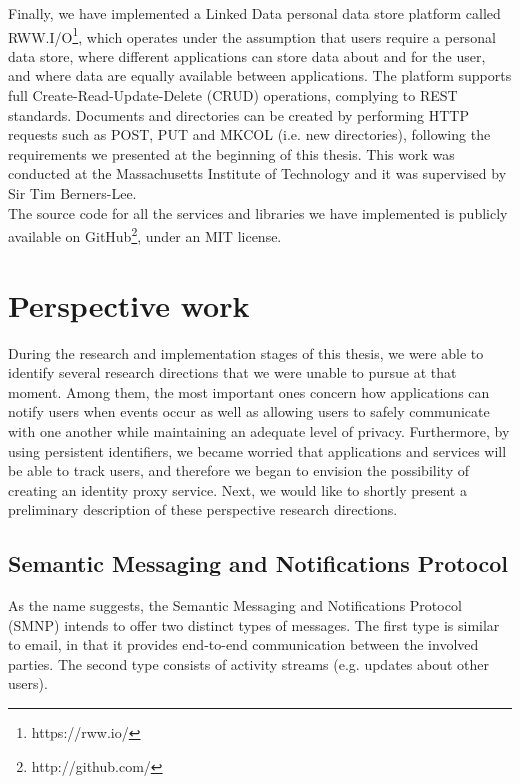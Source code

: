 Finally, we have implemented a Linked Data personal data store platform called RWW.I/O\footnote{https://rww.io/}, which operates under the assumption that users require a personal data store, where different applications can store data about and for the user, and where data are equally available between applications. The platform supports full Create-Read-Update-Delete (CRUD) operations, complying to REST standards. Documents and directories can be created by performing HTTP requests such as POST, PUT and MKCOL (i.e. new directories), following the requirements we presented at the beginning of this thesis. This work was conducted at the Massachusetts Institute of Technology and it was supervised by Sir Tim Berners-Lee.\\

The source code for all the services and libraries we have implemented is publicly available on GitHub\footnote{http://github.com/}, under an MIT license.

\section{Perspective work}
\label{sec:perspectives}

During the research and implementation stages of this thesis, we were able to identify several research directions that we were unable to pursue at that moment. Among them, the most important ones concern how applications can notify users when events occur as well as allowing users to safely communicate with one another while maintaining an adequate level of privacy. Furthermore, by using persistent identifiers, we became worried that applications and services will be able to track users, and therefore we began to envision the possibility of creating an identity proxy service. Next, we would like to shortly present a preliminary description of these perspective research directions.

\subsection{Semantic Messaging and Notifications Protocol}
As the name suggests, the Semantic Messaging and Notifications Protocol (SMNP) intends to offer two distinct types of messages. The first type is similar to email, in that it provides end-to-end communication between the involved parties. The second type consists of activity streams (e.g. updates about other users).\\

